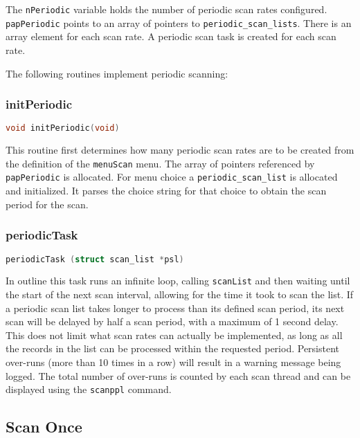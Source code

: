 The \verb|nPeriodic| variable holds the number of periodic scan rates configured.
\verb|papPeriodic| points to an array of pointers to \verb|periodic_scan_lists|.
There is an array element for each scan rate.
A periodic scan task is created for each scan rate.

The following routines implement periodic scanning:

\subsubsection{initPeriodic}

\begin{lstlisting}[language=C]
void initPeriodic(void)
\end{lstlisting}

This routine first determines how many periodic scan rates are to be created from the definition of the \verb|menuScan| menu.
The array of pointers referenced by \verb|papPeriodic| is allocated.
For menu choice a \verb|periodic_scan_list| is allocated and initialized.
It parses the choice string for that choice to obtain the scan period for the scan.

\subsubsection{periodicTask}

\begin{lstlisting}[language=C]
periodicTask (struct scan_list *psl)
\end{lstlisting}

In outline this task runs an infinite loop, calling \verb|scanList| and then waiting until the start of the next scan interval, allowing for the time it took to scan the list.
If a periodic scan list takes longer to process than its defined scan period, its next scan will be delayed by half a scan period, with a maximum of 1 second delay.
This does not limit what scan rates can actually be implemented, as long as all the records in the list can be processed within the requested period.
Persistent over-runs (more than 10 times in a row) will result in a warning message being logged.
The total number of over-runs is counted by each scan thread and can be displayed using the \verb|scanppl| command.

\subsection{Scan Once}


